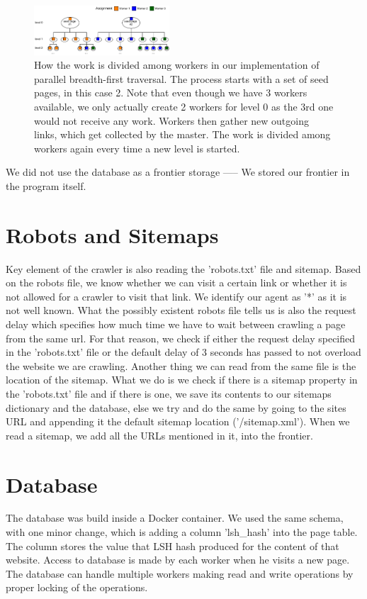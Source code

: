 \documentclass[9pt]{IEEEtran}
\begin{document}
\begin{figure}[h] \centering
    \includegraphics[width=0.45\textwidth]{parallel_bfs.pdf}
    \caption{{How the work is divided among workers in our implementation of parallel breadth-first traversal. The process starts with a set of seed pages, in this case 2. Note that even though we have 3 workers available, we only actually create 2 workers for level 0 as the 3rd one would not receive any work. Workers then gather new outgoing links, which get collected by the master. The work is divided among workers again every time a new level is started.}}
    \label{fig:parallel_bfs}
\end{figure}

We did not use the database as a frontier storage ----- We stored our frontier in the program itself.

\section{Robots and Sitemaps}
Key element of the crawler is also reading the 'robots.txt' file and sitemap. Based on the robots file, we know whether we can visit a certain link or whether it is not allowed for a crawler to visit that link.
We identify our agent as '*' as it is not well known.
What the possibly existent robots file tells us is also the request delay which specifies how much time we have to wait between crawling a page from the same url.
For that reason, we check if either the request delay specified in the 'robots.txt' file or the default delay of 3 seconds has passed to not overload the website we are crawling.
Another thing we can read from the same file is the location of the sitemap.
What we do is we check if there is a sitemap property in the 'robots.txt' file and if there is one, we save its contents to our sitemaps dictionary and the database, else we try and do the same by going to the sites URL and appending it the default sitemap location ('/sitemap.xml').
When we read a sitemap, we add all the URLs mentioned in it, into the frontier. 


\section{Database}\label{section:database}
The database was build inside a Docker container. We used the same schema, with one minor change, which is adding a column 'lsh\_hash' into the page table. The column stores the value that LSH hash produced for the content of that website. Access to database is made by each worker when he visits a new page. The database can handle multiple workers making read and write operations by proper locking of the operations.
\end{document}
